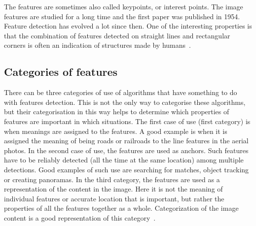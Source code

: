 \documentclass[thesis=B,english]{FITthesis}[2019/12/23]
\begin{document}
        The features are sometimes also called keypoints, or interest points. The image features are studied for a long time and the first paper was published in 1954. Feature detection has evolved a lot since then. One of the interesting properties is that the combination of features detected on straight lines and rectangular corners is often an indication of structures made by humans~\cite{Mikolajczyk2015}.

        \subsection{Categories of features}
        There can be three categories of use of algorithms that have something to do with features detection. This is not the only way to categorise these algorithms, but their categorisation in this way helps to determine which properties of features are important in which situations. The first case of use (first category) is when meanings are assigned to the features. A good example is when it is assigned the meaning of being roads or railroads to the line features in the aerial photos. In the second case of use, the features are used as anchors. Such features have to be reliably detected (all the time at the same location) among multiple detections. Good examples of such use are searching for matches, object tracking or creating panoramas. In the third category, the features are used as a representation of the content in the image. Here it is not the meaning of individual features or accurate location that is important, but rather the properties of all the features together as a whole. Categorization of the image content is a good representation of this category~\cite{Mikolajczyk2015}.
        

        
\end{document}
